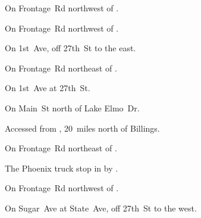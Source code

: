 

\begin{LocationList}

On Frontage~Rd northwest of  .

On Frontage~Rd northwest of  .

On 1st~Ave, off  27th~St to the east.

\Location{\GarageHQ \Garage}
On Frontage~Rd northeast of  .

On 1st~Ave at  27th~St.

On  Main~St north of Lake Elmo~Dr.

Accessed from , 20~miles north of Billings.

On Frontage~Rd northeast of  .

The Phoenix truck stop in  by  .

On Frontage~Rd northwest of  .

On Sugar~Ave at State~Ave, off  27th~St to the west.

\end{LocationList}
